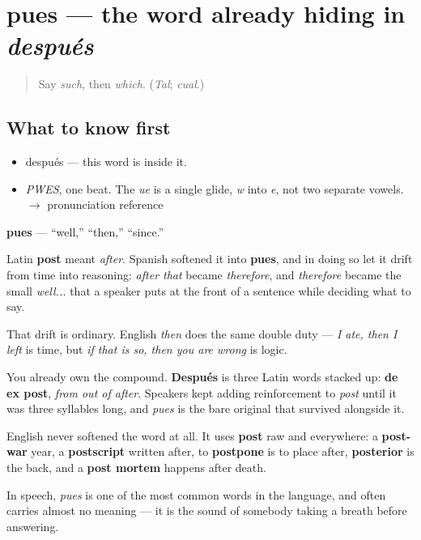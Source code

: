 \section[pues]{pues — the word already hiding in \emph{después}}

\label{lesson:ES-C329-pues}



\begin{quote}
Say \emph{such}, then \emph{which}. (\emph{Tal}; \emph{cual}.)
\end{quote}

\subsection*{What to know first}
\begin{itemize}
\raggedright
  \item después — this word is inside it.
\end{itemize}

\begin{sounds}
\begin{itemize}
\raggedright
  \item \emph{PWES}, one beat. The \emph{ue} is a single glide, \emph{w} into \emph{e}, not two separate vowels. $\to$ pronunciation reference
\end{itemize}
\end{sounds}

\begin{cousinweb}
\textbf{pues} — \textquotedblleft{}well,\textquotedblright{} \textquotedblleft{}then,\textquotedblright{} \textquotedblleft{}since.\textquotedblright{}

Latin \textbf{post} meant \emph{after}. Spanish softened it into \textbf{pues}, and in doing so let it drift from time into reasoning: \emph{after that} became \emph{therefore}, and \emph{therefore} became the small \emph{well...} that a speaker puts at the front of a sentence while deciding what to say.

That drift is ordinary. English \emph{then} does the same double duty — \emph{I ate, then I left} is time, but \emph{if that is so, then you are wrong} is logic.

You already own the compound. \textbf{Después} is three Latin words stacked up: \textbf{de ex post}, \emph{from out of after}. Speakers kept adding reinforcement to \emph{post} until it was three syllables long, and \emph{pues} is the bare original that survived alongside it.

English never softened the word at all. It uses \textbf{post} raw and everywhere: a \textbf{post-war} year, a \textbf{postscript} written after, to \textbf{postpone} is to place after, \textbf{posterior} is the back, and a \textbf{post mortem} happens after death.

In speech, \emph{pues} is one of the most common words in the language, and often carries almost no meaning — it is the sound of somebody taking a breath before answering.
\end{cousinweb}

